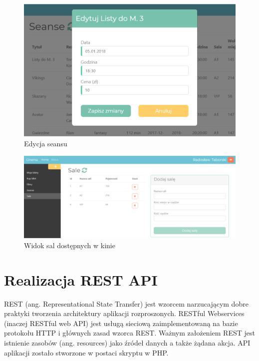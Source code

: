 \begin{figure} [H]
	\centering
	\includegraphics[width=1\linewidth]{rozdzial05/interfejs/edytujSeans.png}
	\caption{Edycja seansu}
	\label{fig:screen9}
\end{figure}

\begin{figure} [H]
	\centering
	\includegraphics[width=1\linewidth]{rozdzial05/interfejs/sale.png}
	\caption{Widok sal dostępnych w kinie}
	\label{fig:screen10}
\end{figure}

\section{Realizacja REST API}

REST (ang. Representational State Transfer) jest wzorcem narzucającym dobre praktyki tworzenia architektury aplikacji rozproszonych. RESTful Webservices (inaczej RESTful web API) jest usługą sieciową zaimplementowaną na bazie protokołu HTTP i głównych zasad wzorca REST. Ważnym założeniem REST jest istnienie zasobów (ang. resources) jako źródeł danych a także żądana akcja. API aplikacji zostało stworzone w postaci skryptu w PHP.

